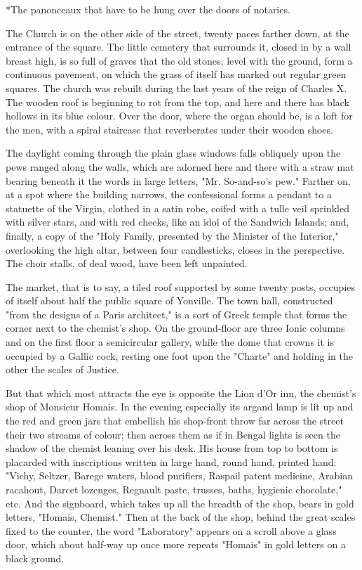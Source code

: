 \documentclass[11pt,twocolumn]{ltugboat}
\begin{document}
     *The panonceaux that have to be hung over the doors of
     notaries.

The Church is on the other side of the street, twenty paces farther
down, at the entrance of the square. The little cemetery that surrounds
it, closed in by a wall breast high, is so full of graves that the old
stones, level with the ground, form a continuous pavement, on which the
grass of itself has marked out regular green squares. The church was
rebuilt during the last years of the reign of Charles X. The wooden roof
is beginning to rot from the top, and here and there has black hollows
in its blue colour. Over the door, where the organ should be, is a
loft for the men, with a spiral staircase that reverberates under their
wooden shoes.

The daylight coming through the plain glass windows falls obliquely upon
the pews ranged along the walls, which are adorned here and there with
a straw mat bearing beneath it the words in large letters, "Mr.
So-and-so's pew." Farther on, at a spot where the building narrows, the
confessional forms a pendant to a statuette of the Virgin, clothed in
a satin robe, coifed with a tulle veil sprinkled with silver stars, and
with red cheeks, like an idol of the Sandwich Islands; and, finally, a
copy of the "Holy Family, presented by the Minister of the Interior,"
overlooking the high altar, between four candlesticks, closes in the
perspective. The choir stalls, of deal wood, have been left unpainted.

The market, that is to say, a tiled roof supported by some twenty posts,
occupies of itself about half the public square of Yonville. The town
hall, constructed "from the designs of a Paris architect," is a sort of
Greek temple that forms the corner next to the chemist's shop. On
the ground-floor are three Ionic columns and on the first floor a
semicircular gallery, while the dome that crowns it is occupied by a
Gallic cock, resting one foot upon the "Charte" and holding in the other
the scales of Justice.

But that which most attracts the eye is opposite the Lion d'Or inn, the
chemist's shop of Monsieur Homais. In the evening especially its argand
lamp is lit up and the red and green jars that embellish his shop-front
throw far across the street their two streams of colour; then across
them as if in Bengal lights is seen the shadow of the chemist
leaning over his desk. His house from top to bottom is placarded with
inscriptions written in large hand, round hand, printed hand: "Vichy,
Seltzer, Barege waters, blood purifiers, Raspail patent medicine,
Arabian racahout, Darcet lozenges, Regnault paste, trusses, baths,
hygienic chocolate," etc. And the signboard, which takes up all the
breadth of the shop, bears in gold letters, "Homais, Chemist." Then at
the back of the shop, behind the great scales fixed to the counter, the
word "Laboratory" appears on a scroll above a glass door, which about
half-way up once more repeats "Homais" in gold letters on a black
ground.
\end{document}
